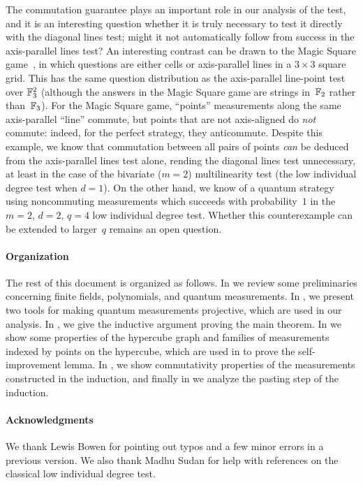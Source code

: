 The commutation guarantee plays an important role in our analysis of
the test, and it is an interesting question whether it is truly
necessary to test it directly with the diagonal lines test; might it
not automatically follow from success in the axis-parallel lines test? An interesting contrast can be drawn to
the Magic Square
game~\cite{mermin1990simple,peres1990incompatible,aravind2002simple},
in which questions are either cells or axis-parallel lines in a $3 \times 3$ square grid.
This has the same question distribution as
the axis-parallel line-point test over $\mathbb F_3^2$ (although the answers in the Magic Square game are strings in~$\mathbb F_2$ rather than~$\mathbb F_3$).
For the Magic Square game,
``points'' measurements along the same axis-parallel ``line'' commute,
but points that are not axis-aligned do \emph{not} commute: indeed,
for the perfect strategy, they anticommute. Despite this example,
we know that commutation between all pairs of points \emph{can} be deduced from the
axis-parallel lines test alone, rending the diagonal lines test unnecessary,
at least in the case of the bivariate ($m = 2$) multilinearity test (the low individual degree test when $d = 1$).
On the other hand, we know of a quantum strategy using noncommuting measurements
which succeeds with probability~$1$ in the $m = 2$, $d = 2$, $q = 4$ low individual degree test.
Whether this counterexample can be extended to larger~$q$ remains an open question.

\paragraph{Organization}
The rest of this document is organized as follows. In
 we review some preliminaries concerning finite
fields, polynomials, and quantum measurements. In
, we present two tools for
making quantum measurements projective, which are used in our
analysis. In , we give the inductive argument
proving the main theorem. In  we show
some properties of the hypercube graph and families of measurements
indexed by points on the hypercube, which are used in
 to prove the self-improvement lemma. In
, we show commutativity
properties of the measurements constructed in the induction, and
finally in  we analyze the pasting step of the induction.


\paragraph{Acknowledgments}

We thank Lewis Bowen for pointing out typos and a few minor errors in a previous version.
We also thank Madhu Sudan for help with references on the classical low individual degree test.



  




